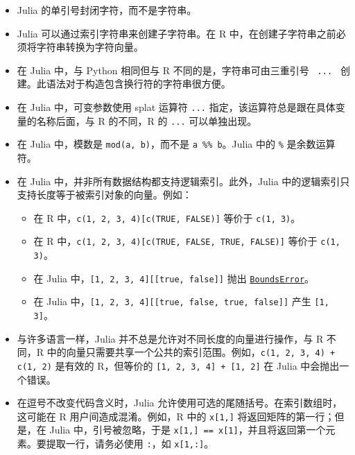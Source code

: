 \begin{itemize}
\item Julia 的单引号封闭字符，而不是字符串。


\item Julia 可以通过索引字符串来创建子字符串。在 R 中，在创建子字符串之前必须将字符串转换为字符向量。


\item 在 Julia 中，与 Python 相同但与 R 不同的是，字符串可由三重引号 \texttt{{\textquotedbl}{\textquotedbl}{\textquotedbl} ... {\textquotedbl}{\textquotedbl}{\textquotedbl}} 创建。此语法对于构造包含换行符的字符串很方便。


\item 在 Julia 中，可变参数使用 splat 运算符 \texttt{...} 指定，该运算符总是跟在具体变量的名称后面，与 R 的不同，R 的 \texttt{...} 可以单独出现。


\item 在 Julia 中，模数是 \texttt{mod(a, b)}，而不是 \texttt{a \%\% b}。Julia 中的 \texttt{\%} 是余数运算符。


\item 在 Julia 中，并非所有数据结构都支持逻辑索引。此外，Julia 中的逻辑索引只支持长度等于被索引对象的向量。例如：

\begin{itemize}
\item 在 R 中，\texttt{c(1, 2, 3, 4)[c(TRUE, FALSE)]} 等价于 \texttt{c(1, 3)}。


\item 在 R 中，\texttt{c(1, 2, 3, 4)[c(TRUE, FALSE, TRUE, FALSE)]} 等价于 \texttt{c(1, 3)}。


\item 在 Julia 中，\texttt{[1, 2, 3, 4][[true, false]]} 抛出 \hyperlink{9731558909100893938}{\texttt{BoundsError}}。


\item 在 Julia 中，\texttt{[1, 2, 3, 4][[true, false, true, false]]} 产生 \texttt{[1, 3]}。

\end{itemize}

\item 与许多语言一样，Julia 并不总是允许对不同长度的向量进行操作，与 R 不同，R 中的向量只需要共享一个公共的索引范围。例如，\texttt{c(1, 2, 3, 4) + c(1, 2)} 是有效的 R，但等价的 \texttt{[1, 2, 3, 4] + [1, 2]} 在 Julia 中会抛出一个错误。


\item 在逗号不改变代码含义时，Julia 允许使用可选的尾随括号。在索引数组时，这可能在 R 用户间造成混淆。例如，R 中的 \texttt{x[1,]} 将返回矩阵的第一行；但是，在 Julia 中，引号被忽略，于是 \texttt{x[1,] == x[1]}，并且将返回第一个元素。要提取一行，请务必使用 \texttt{:}，如 \texttt{x[1,:]}。



\end{itemize}
